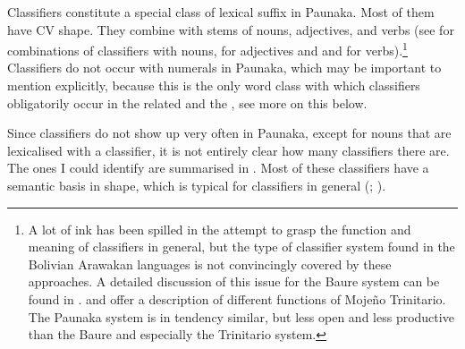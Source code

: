 Classifiers constitute a special class of lexical suffix in Paunaka. Most of them have CV shape. They combine with stems of nouns, adjectives, and verbs (see  for combinations of classifiers with nouns,  for adjectives and  and  for verbs).\footnote{A lot of ink has been spilled in the attempt to grasp the function and meaning of classifiers in general, but the type of classifier system found in the Bolivian Arawakan languages is not convincingly covered by these approaches. A detailed discussion of this issue for the Baure system can be found in \citet[174--177]{Terhart2016}. \citet{Rose2019b} and \citet{RoseVanlinden2022} offer a description of different functions of Mojeño Trinitario. The Paunaka system is in tendency similar, but less open and less productive than the Baure and especially the Trinitario system.} Classifiers do not occur with numerals in Paunaka, which may be important to mention explicitly, because this is the only word class with which classifiers obligatorily occur in the related  and the , see more on this below.

Since classifiers do not show up very often in Paunaka, except for nouns that are lexicalised with a classifier, it is not entirely clear how many classifiers there are. The ones I could identify are summarised in . Most of these classifiers have a semantic basis in shape, which is typical for classifiers in general (\citealp[cf.][300--301]{Allan1977}; \citealt[273]{Aikhenvald2003}). 



